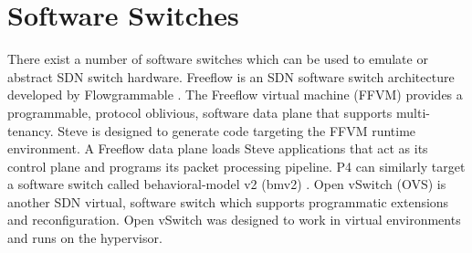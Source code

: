 \section{Software Switches}
\label{rel:freeflow}

There exist a number of software switches which can be used to emulate or abstract SDN switch hardware.
Freeflow is an SDN software switch architecture developed
by Flowgrammable \cite{freeflow_software}. The Freeflow virtual machine (FFVM) 
provides a programmable, protocol oblivious, software data plane that 
supports multi-tenancy. Steve is
designed to generate code targeting the FFVM runtime environment. A Freeflow data 
plane loads Steve applications that act as its control plane and programs its packet processing pipeline.
P4 can similarly target a software switch called behavioral-model v2 (bmv2) \cite{bmv2_software}. 
Open vSwitch (OVS) is another SDN virtual, software switch which supports programmatic extensions \cite{ovs_man_page, ovs2009extending, ovs2013} and reconfiguration. Open vSwitch was designed to work in virtual environments and runs on the hypervisor.




